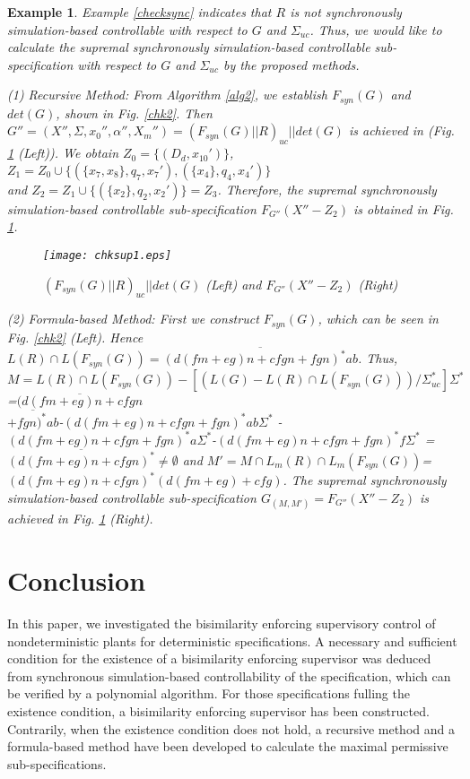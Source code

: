 \documentclass[preprint,authoryear,12pt]{elsarticle}
\newtheorem{Example}{Example}
\begin{document}
\begin{Example}\label{sub2}
Example \ref{checksync} indicates that $R$ is not synchronously
simulation-based controllable with respect to $G$ and
$\Sigma_{uc}$. Thus, we would like to calculate the supremal
synchronously simulation-based controllable sub-specification with
respect to $G$ and $\Sigma_{uc}$ by the proposed methods.

(1) Recursive Method: From Algorithm \ref{alg2}, we establish
$F_{syn}(G)$ and $det(G)$, shown in Fig. \ref{chk2}. Then
$G''\!=(X'', \Sigma, x_{0}'', \alpha'',
X_{m}'')\!=(F_{syn}(G)||R)_{uc}||det(G)$ is achieved in (Fig.
\ref{chksup} (Left)). We obtain $Z_0\!=\!\{(D_{d}, x_{10}')\}$,
$Z_1\!=Z_0 \!\cup \!\{ (\{x_7, x_8\}, q_7, x_7'), (\{x_4\},q_4,
x_4')\}$ \\ and $Z_2\!= \!Z_1 \! \cup \! \{(\{x_2\}, q_2,
x_2')\}\!=\!Z_3$. Therefore, the supremal synchronously
simulation-based controllable sub-specification
$F_{G''}(X''\!-\!Z_{2})$ is obtained in Fig. \ref{chksup}.


\begin{figure}[!htb]
\begin{center}
\texttt{[image: chksup1.eps]}
\caption{ $(F_{syn}(G)|| R)_{uc}||det(G)$ (Left) and
$F_{G''}(X''-Z_2)$ (Right)} \label{chksup}
\end{center}
\end{figure}

(2) Formula-based Method: First we construct $F_{syn}(G)$, which
can be seen in Fig. \ref{chk2} (Left). Hence $L(R) \cap
L(F_{syn}(G)) =\overline{(d(fm+eg)n+cfgn+fgn)^{*}ab}$. Thus,
$M=L(R) \cap L(F_{syn}(G))-[(L(G)-L(R) \cap
L(F_{syn}(G)))/\Sigma_{uc}^{*}]\Sigma^{*}$=$\overline{(d(fm+eg)n+cfgn
}$\\$\overline{+fgn)^{*}ab}$-$(d(fm+eg)n+cfgn+fgn)^{*}ab\Sigma^{*}$
-$(d(fm+eg)n+cfgn+fgn)^{*}a\Sigma^{*}$-$(d(fm+eg)n+cfgn+fgn)^{*}f\Sigma^{*}$
=$\overline{(d(fm+eg)n+cfgn)^{*}}\neq\emptyset$ and $M'=M \cap
L_{m}(R) \cap
L_{m}(F_{syn}(G))$=$(d(fm+eg)n+cfgn)^{*}(d(fm+eg)+cfg)$. The
supremal synchronously simulation-based controllable
sub-specification $G_{(M, M')}\!=F_{G''}(X''-Z_2)$ is achieved in
Fig. \ref{chksup} (Right).
\end{Example}

\section{Conclusion}
In this paper, we investigated the bisimilarity enforcing
supervisory control of nondeterministic plants for deterministic
specifications. A necessary and sufficient condition for the
existence of a bisimilarity enforcing supervisor was deduced from
synchronous simulation-based controllability of the specification,
which can be verified by a polynomial algorithm. For those
specifications fulling the existence condition, a bisimilarity
enforcing supervisor has been constructed. Contrarily, when the
existence condition does not hold, a recursive method and a
formula-based method have been developed to calculate the maximal
permissive sub-specifications.












\end{document}
